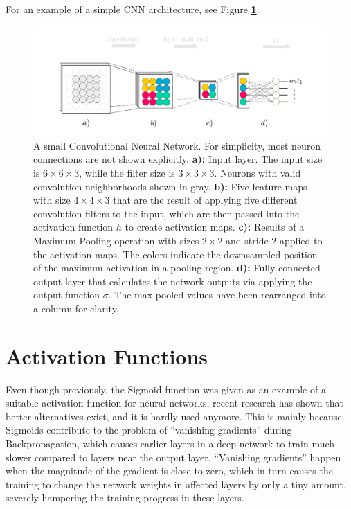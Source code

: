 For an example of a simple CNN architecture, see Figure \textbf{\ref{fig:convnet}}.

\begin {figure}[!htb]
	\begin{flushleft}
		\includegraphics[scale=0.65]{img/fig_convnet}
	\end{flushleft}
	\caption[A small Convolutional Neural Network.]{A small Convolutional Neural Network. For simplicity, most neuron connections are not shown explicitly. \textbf{a):} Input layer. The input size is $6 \times 6 \times 3$, while the filter size is $3 \times 3 \times 3$. Neurons with valid convolution neighborhoods shown in gray. \textbf{b):} Five feature maps with size $4 \times 4 \times 3$ that are the result of applying five different convolution filters to the input, which are then passed into the activation function $h$ to create activation maps. \textbf{c):} Results of a Maximum Pooling operation with sizes $2 \times 2$ and stride $2$ applied to the activation maps. The colors indicate the downsampled position of the maximum activation in a pooling region. \textbf{d):} Fully-connected output layer that calculates the network outputs via applying the output function $\sigma$. The max-pooled values have been rearranged into a column for clarity.}
	\label{fig:convnet}
\end {figure}


	\section {Activation Functions}
Even though previously, the Sigmoid function was given as an example of a suitable activation function for neural networks, recent research \cite{glorot, rectifiers} has shown that better alternatives exist, and it is hardly used anymore. This is mainly because Sigmoids contribute to the problem of ``vanishing gradients'' during Backpropagation, which causes earlier layers in a deep network to train much slower compared to layers near the output layer. ``Vanishing gradients'' happen when the magnitude of the gradient is close to zero, which in turn causes the training to change the network weights in affected layers by only a tiny amount, severely hampering the training progress in these layers.


